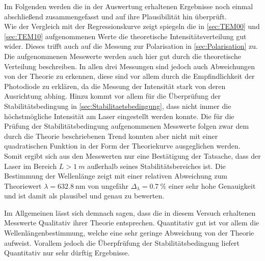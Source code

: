 Im Folgenden werden die in der Auswertung erhaltenen Ergebnisse noch einmal abschließend zusammengefasst 
und auf ihre Plausibilität hin überprüft.\\

Wie der Vergleich mit der Regressionskurve zeigt spiegeln die in \cref{sec:TEM00} und \cref{sec:TEM10} aufgenommenen Werte 
die theoretische Intensitätsverteilung gut wider. Dieses trifft auch auf die Messung zur Polarisation in \cref{sec:Polarisation}
zu. Die aufgenommenen Messwerte werden auch hier gut durch die theoretische Verteilung beschreiben. In allen drei Messungen 
sind jedoch auch Abweichungen von der Theorie zu erkennen, diese sind vor allem durch die Empfindlichkeit der Photodiode 
zu erklären, da die Messung der Intensität stark von deren Ausrichtung abhing. Hinzu kommt vor allem für die 
Überprüfung der Stabilitätsbedingung in \cref{sec:Stabilitaetsbedingung}, dass nicht immer die höchstmögliche Intensität am Laser 
eingestellt werden konnte. Die für die Prüfung der Stabilitätsbedingung aufgenommenen Messwerte folgen zwar dem durch die Theorie
beschriebenen Trend konnten aber nicht mit einer quadratischen Funktion in der Form der Theoriekurve ausgeglichen werden.
Somit ergibt sich aus den Messwerten nur eine Bestätigung der Tatsache, dass der Laser im Bereich $L > \SI{1}{m}$ außerhalb seines
Stabilitätsbereiches ist.
Die Bestimmung der Wellenlänge zeigt mit einer relativen Abweichung zum Theoriewert $\lambda = \SI{632.8}{\nm}$ 
von ungefähr $\Delta_{\lambda} = \SI{0.7}{\percent}$  einer sehr hohe Genauigkeit und ist damit als plausibel und genau zu bewerten.

Im Allgemeinen lässt sich demnach sagen, dass die in diesem Versuch erhaltenen Messwerte Qualitativ ihrer Theorie entsprechen.
Quantitativ gut ist vor allem die Wellenlängenbestimmung, welche eine sehr geringe Abweichung von der Theorie aufweist.
Vorallem jedoch die Überpfrüfung der Stabilitätsbedingung liefert Quantitativ nur sehr dürftig Ergebnisse. 